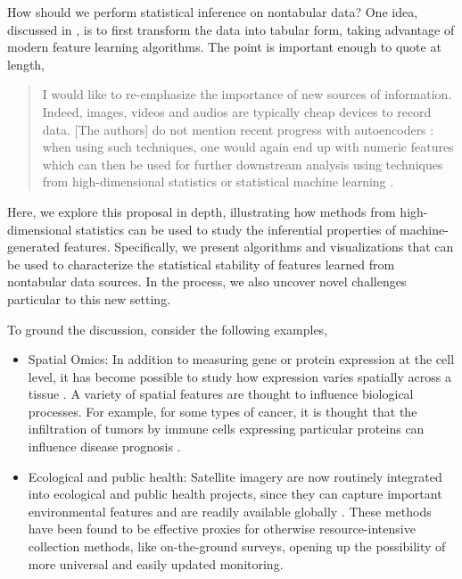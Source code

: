 
How should we perform statistical inference on nontabular data? One idea,
discussed in \citep{buhlmann2019comments}, is to first transform the data into
tabular form, taking advantage of modern feature learning algorithms. The point
is important enough to quote at length,

\begin{quote}
I would like to re-emphasize the importance of new sources of information.
Indeed, images, videos and audios are typically cheap devices to record data.
[The authors] do not mention recent progress with autoencoders
\citep{hinton2006reducing, vincent2010stacked}: when using such techniques, one
would again end up with numeric features which can then be used for further
downstream analysis using techniques from high-dimensional statistics or
statistical machine learning \citep{hastie2015statistical,
  buhlmann2011statistics}.
\end{quote}

Here, we explore this proposal in depth, illustrating how methods from
high-dimensional statistics can be used to study the inferential properties of
machine-generated features. Specifically, we present algorithms and
visualizations that can be used to characterize the statistical stability of
features learned from nontabular data sources. In the process, we also uncover
novel challenges particular to this new setting.

To ground the discussion, consider the following examples,

\begin{itemize}
\item Spatial Omics: In addition to measuring gene or protein expression at the
  cell level, it has become possible to study how expression varies spatially
  across a tissue \citep{lundberg2019spatial}. A variety of spatial features are
  thought to influence biological processes. For example, for some types of
  cancer, it is thought that the infiltration of tumors by immune cells
  expressing particular proteins can influence disease prognosis
  \citep{keren2018structured}.
\item Ecological and public health: Satellite imagery are now routinely
  integrated into ecological and public health projects, since they can capture
  important environmental features and are readily available globally
  \citep{jean2016combining, bondimapping}. These methods have been found to be effective
  proxies for otherwise resource-intensive collection methods, like
  on-the-ground surveys, opening up the possibility of more universal and easily
  updated monitoring.
\end{itemize}

